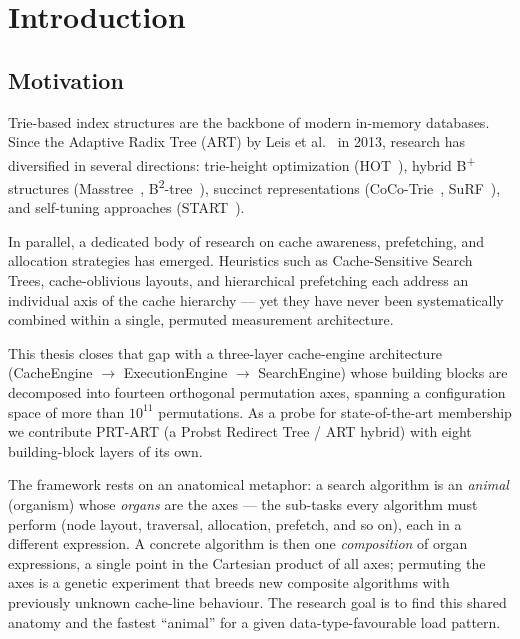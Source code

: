 \chapter{Introduction}\label{ch:intro}

\section{Motivation}\label{sec:motivation}

Trie-based index structures are the backbone of modern in-memory databases.
Since the Adaptive Radix Tree (ART) by Leis et al.~\cite{leis2013art} in 2013,
research has diversified in several directions: trie-height optimization
(HOT~\cite{binna2018hot}), hybrid B\textsuperscript{+} structures
(Masstree~\cite{mao2012masstree}, B\textsuperscript{2}-tree~\cite{schmeisser2022b2tree}),
succinct representations (CoCo-Trie~\cite{boffa2024coco}, SuRF~\cite{zhang2018surf}),
and self-tuning approaches (START~\cite{fent2020start}).

In parallel, a dedicated body of research on cache awareness, prefetching, and
allocation strategies has emerged. Heuristics such as Cache-Sensitive Search
Trees, cache-oblivious layouts, and hierarchical prefetching each address an
individual axis of the cache hierarchy --- yet they have never been
systematically combined within a single, permuted measurement architecture.

This thesis closes that gap with a three-layer cache-engine architecture
(CacheEngine $\to$ ExecutionEngine $\to$ SearchEngine) whose building blocks are
decomposed into fourteen orthogonal permutation axes, spanning a configuration
space of more than $10^{11}$ permutations. As a probe for state-of-the-art
membership we contribute PRT-ART (a Probst Redirect Tree / ART hybrid) with eight
building-block layers of its own.

The framework rests on an anatomical metaphor: a search algorithm is an
\emph{animal} (organism) whose \emph{organs} are the axes --- the sub-tasks every
algorithm must perform (node layout, traversal, allocation, prefetch, and so on),
each in a different expression. A concrete algorithm is then one \emph{composition}
of organ expressions, a single point in the Cartesian product of all axes; permuting
the axes is a genetic experiment that breeds new composite algorithms with previously
unknown cache-line behaviour. The research goal is to find this shared anatomy and the
fastest ``animal'' for a given data-type-favourable load pattern.

